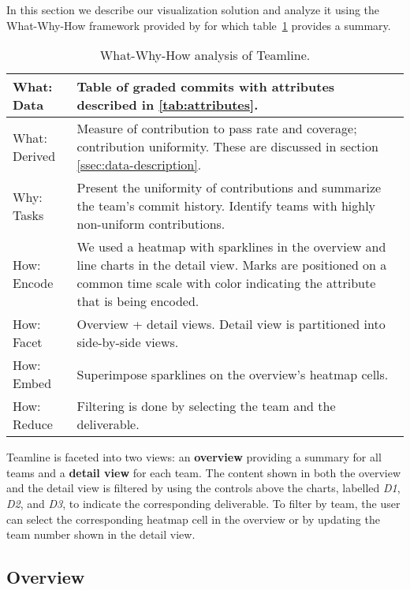 \documentclass[../manifest.tex]{subfiles}
\begin{document}
In this section we describe our visualization solution and analyze it using the What-Why-How framework provided by \cite{Munzner:2014} for which table~\ref{tab:analysis} provides a summary.

\begin{table}
  \caption{What-Why-How analysis of Teamline.}
  \label{tab:analysis}
  \begin{tabularx}{\columnwidth}{ l | X }
    \hline
    What: Data & Table of graded commits with attributes described in \ref{tab:attributes}. \\
    \hline
    What: Derived & Measure of contribution to pass rate and coverage; contribution uniformity. These are discussed in section \ref{ssec:data-description}. \\
    \hline
    Why: Tasks & Present the uniformity of contributions and summarize the team's commit history. Identify teams with highly non-uniform contributions. \\
    \hline
    How: Encode & We used a heatmap with sparklines in the overview  and line charts in the detail view. Marks are positioned on a common time scale with color indicating the attribute that is being encoded.\\
    \hline
    How: Facet & Overview + detail views. Detail view is partitioned into side-by-side views. \\
    \hline
    How: Embed & Superimpose sparklines on the overview's heatmap cells. \\
    \hline
    How: Reduce & Filtering is done by selecting the team and the deliverable. \\
    \hline
  \end{tabularx}
\end{table}

Teamline is faceted into two views: an \textbf{overview} providing a summary for all teams and a \textbf{detail view} for each team. The content shown in both the overview and the detail view is filtered by using the controls above the charts, labelled \textit{D1}, \textit{D2}, and \textit{D3}, to indicate the corresponding deliverable. To filter by team, the user can select the corresponding heatmap cell in the overview or by updating the team number shown in the detail view.

\subsection{Overview}
\end{document}
